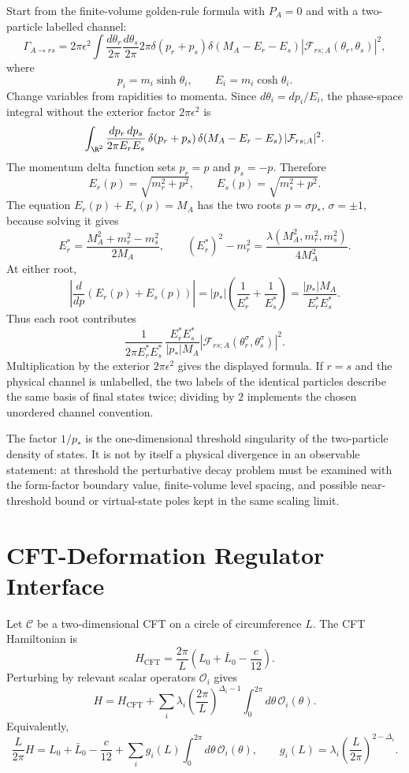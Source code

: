 Start from the finite-volume golden-rule formula with \(P_A=0\) and with a
two-particle labelled channel:
\[
  \Gamma_{A\to rs}
  =
  2\pi\epsilon^2
  \int
  \frac{d\theta_r}{2\pi}
  \frac{d\theta_s}{2\pi}
  2\pi\delta(p_r+p_s)
  \delta(M_A-E_r-E_s)
  |\mathcal F_{rs;A}(\theta_r,\theta_s)|^2 ,
\]
where
\[
  p_i=m_i\sinh\theta_i,\qquad E_i=m_i\cosh\theta_i .
\]
Change variables from rapidities to momenta.  Since \(d\theta_i=dp_i/E_i\),
the phase-space integral without the exterior factor \(2\pi\epsilon^2\) is
\[
  \int_{\R^2}
  \frac{dp_r\,dp_s}{2\pi E_rE_s}\,
  \delta(p_r+p_s)\,
  \delta(M_A-E_r-E_s)\,
  |\mathcal F_{rs;A}|^2 .
\]
The momentum delta function sets \(p_r=p\) and \(p_s=-p\).  Therefore
\[
  E_r(p)=\sqrt{m_r^2+p^2},\qquad
  E_s(p)=\sqrt{m_s^2+p^2}.
\]
The equation \(E_r(p)+E_s(p)=M_A\) has the two roots
\(p=\sigma p_*\), \(\sigma=\pm1\), because solving it gives
\[
  E_r^*=\frac{M_A^2+m_r^2-m_s^2}{2M_A},
  \qquad
  (E_r^*)^2-m_r^2
  =
  \frac{\lambda(M_A^2,m_r^2,m_s^2)}{4M_A^2}.
\]
At either root,
\[
  \left|
  \frac{d}{dp}(E_r(p)+E_s(p))
  \right|
  =
  |p_*|\left(\frac1{E_r^*}+\frac1{E_s^*}\right)
  =
  \frac{|p_*|M_A}{E_r^*E_s^*}.
\]
Thus each root contributes
\[
  \frac{1}{2\pi E_r^*E_s^*}\,
  \frac{E_r^*E_s^*}{|p_*|M_A}
  |\mathcal F_{rs;A}(\theta_r^\sigma,\theta_s^\sigma)|^2 .
\]
Multiplication by the exterior \(2\pi\epsilon^2\) gives the displayed
formula.  If \(r=s\) and the physical channel is unlabelled, the two labels
of the identical particles describe the same basis of final states twice;
dividing by \(2\) implements the chosen unordered channel convention.

The factor \(1/p_*\) is the one-dimensional threshold singularity of the
two-particle density of states.  It is not by itself a physical divergence in
an observable statement: at threshold the perturbative decay problem must be
examined with the form-factor boundary value, finite-volume level spacing,
and possible near-threshold bound or virtual-state poles kept in the same
scaling limit.

\section{CFT-Deformation Regulator Interface}

Let \(\mathcal C\) be a two-dimensional CFT on a circle of circumference
\(L\).  The CFT Hamiltonian is
\[
  H_{\mathrm{CFT}}
  =
  \frac{2\pi}{L}
  \left(L_0+\bar L_0-\frac{c}{12}\right).
\]
Perturbing by relevant scalar operators \(\mathcal O_i\) gives
\[
  H
  =
  H_{\mathrm{CFT}}
  +
  \sum_i \lambda_i
  \left(\frac{2\pi}{L}\right)^{\Delta_i-1}
  \int_0^{2\pi}d\theta\,\mathcal O_i(\theta).
\]
Equivalently,
\[
  \frac{L}{2\pi}H
  =
  L_0+\bar L_0-\frac{c}{12}
  +
  \sum_i g_i(L)\int_0^{2\pi}d\theta\,\mathcal O_i(\theta),
  \qquad
  g_i(L)=\lambda_i\left(\frac{L}{2\pi}\right)^{2-\Delta_i}.
\]

